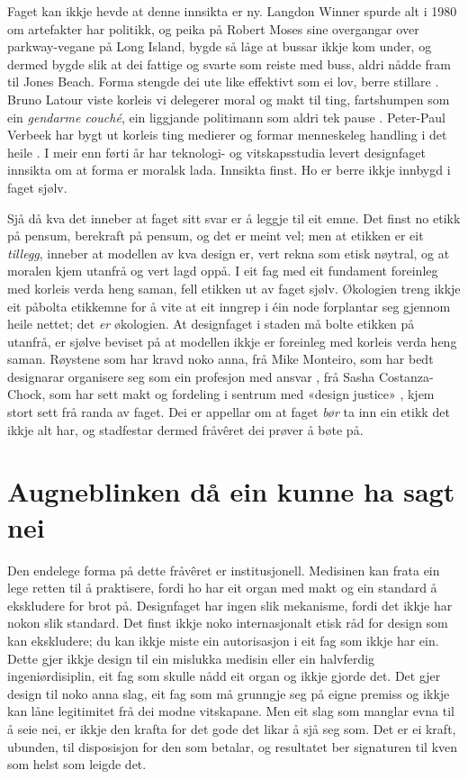 Faget kan ikkje hevde at denne innsikta er ny. Langdon Winner spurde alt i 1980 om artefakter har politikk, og peika på Robert Moses sine overgangar over parkway-vegane på Long Island, bygde så låge at bussar ikkje kom under, og dermed bygde slik at dei fattige og svarte som reiste med buss, aldri nådde fram til Jones Beach. Forma stengde dei ute like effektivt som ei lov, berre stillare \autocite{winner1980}. Bruno Latour viste korleis vi delegerer moral og makt til ting, fartshumpen som ein \emph{gendarme couché}, ein liggjande politimann som aldri tek pause \autocite{latour1992missing}. Peter-Paul Verbeek har bygt ut korleis ting medierer og formar menneskeleg handling i det heile \autocite{verbeek2011}. I meir enn førti år har teknologi- og vitskapsstudia levert designfaget innsikta om at forma er moralsk lada. Innsikta finst. Ho er berre ikkje innbygd i faget sjølv.

Sjå då kva det inneber at faget sitt svar er å leggje til eit emne. Det finst no etikk på pensum, berekraft på pensum, og det er meint vel; men at etikken er eit \emph{tillegg}, inneber at modellen av kva design er, vert rekna som etisk nøytral, og at moralen kjem utanfrå og vert lagd oppå. I eit fag med eit fundament foreinleg med korleis verda heng saman, fell etikken ut av faget sjølv. Økologien treng ikkje eit påbolta etikkemne for å vite at eit inngrep i éin node forplantar seg gjennom heile nettet; det \emph{er} økologien. At designfaget i staden må bolte etikken på utanfrå, er sjølve beviset på at modellen ikkje er foreinleg med korleis verda heng saman. Røystene som har kravd noko anna, frå Mike Monteiro, som har bedt designarar organisere seg som ein profesjon med ansvar \autocite{monteiro2019}, frå Sasha Costanza-Chock, som har sett makt og fordeling i sentrum med «design justice» \autocite{costanzachock2020}, kjem stort sett frå randa av faget. Dei er appellar om at faget \emph{bør} ta inn ein etikk det ikkje alt har, og stadfestar dermed fråvêret dei prøver å bøte på.

\section{Augneblinken då ein kunne ha sagt nei}

Den endelege forma på dette fråvêret er institusjonell. Medisinen kan frata ein lege retten til å praktisere, fordi ho har eit organ med makt og ein standard å ekskludere for brot på. Designfaget har ingen slik mekanisme, fordi det ikkje har nokon slik standard. Det finst ikkje noko internasjonalt etisk råd for design som kan ekskludere; du kan ikkje miste ein autorisasjon i eit fag som ikkje har ein. Dette gjer ikkje design til ein mislukka medisin eller ein halvferdig ingeniørdisiplin, eit fag som skulle nådd eit organ og ikkje gjorde det. Det gjer design til noko anna slag, eit fag som må grunngje seg på eigne premiss og ikkje kan låne legitimitet frå dei modne vitskapane. Men eit slag som manglar evna til å seie nei, er ikkje den krafta for det gode det likar å sjå seg som. Det er ei kraft, ubunden, til disposisjon for den som betalar, og resultatet ber signaturen til kven som helst som leigde det.

